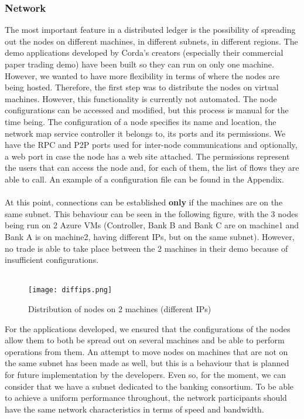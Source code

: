\documentclass[12pt,twoside]{article}
\begin{document}
\subsubsection{Network}
The most important feature in a distributed ledger is the possibility of spreading out the nodes on different machines, in different subnets, in different regions. The demo applications developed by Corda's creators (especially their commercial paper trading demo) have been built so they can run on only one machine. However, we wanted to have more flexibility in terms of where the nodes are being hosted. Therefore, the first step was to distribute the nodes on virtual machines. However, this functionality is currently not automated. The node configurations can be accessed and modified, but this process is manual for the time being. The configuration of a node specifies its name and location, the network map service controller it belongs to, its ports and its permissions. We have the RPC and P2P ports used for inter-node communications and optionally, a web port in case the node has a web site attached. The permissions represent the users that can access the node and, for each of them, the list of flows they are able to call. An example of a configuration file can be found in the Appendix.
\\ \\
At this point, connections can be established \textbf{only} if the machines are on the same subnet. This behaviour can be seen in the following figure, with the 3 nodes being run on 2 Azure VMs (Controller, Bank B and Bank C are on machine1 and Bank A is on machine2, having different IPs, but on the same subnet). However, no trade is able to take place between the 2 machines in their demo because of insufficient configurations. \\ \\
\begin{figure}[H]
\centering
\texttt{[image: diffips.png]}
\caption{Distribution of nodes on 2 machines (different IPs)}
\centering
\label{fig:IPs}
\end{figure}
For the applications developed, we ensured that the configurations of the nodes allow them to both be spread out on several machines and be able to perform operations from them. An attempt to move nodes on machines that are not on the same subnet has been made as well, but this is a behaviour that is planned for future implementation by the developers. Even so, for the moment, we can consider that we have a subnet dedicated to the banking consortium. To be able to achieve a uniform performance throughout, the network participants should have the same network characteristics in terms of speed and bandwidth.
\end{document}
